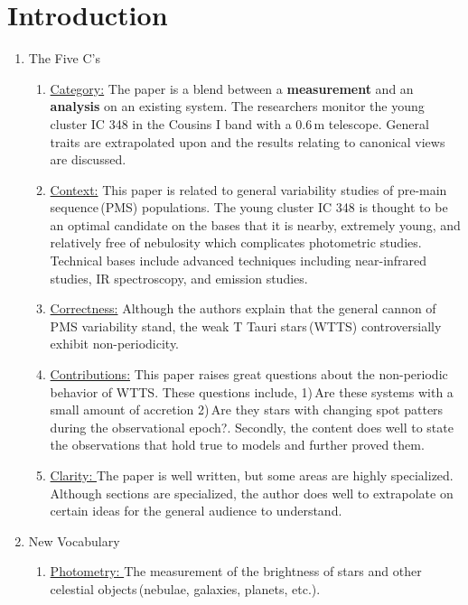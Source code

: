 \documentclass[twocolumn]{aastex6}
\begin{document}

\section{Introduction} \label{sec:intro}
\begin{enumerate}
	\item The Five C's
		\begin{enumerate}
			\item \underline{Category:} The paper is a blend between a \textbf{measurement} and an \textbf{analysis} on an existing system. The researchers monitor the young cluster IC 348 in the Cousins I band with a 0.6\,m telescope. General traits are extrapolated upon and the results relating to canonical views are discussed.
			\item \underline{Context:} This paper is related to general variability studies of pre-main sequence\,(PMS) populations. The young cluster IC 348 is thought to be an optimal candidate on the bases that it is nearby, extremely young, and relatively free of nebulosity which complicates photometric studies. Technical bases include advanced techniques including near-infrared studies, IR spectroscopy, and emission studies.
			\item \underline{Correctness:} Although the authors explain that the general cannon of PMS variability stand, the weak T Tauri stars\,(WTTS) controversially exhibit non-periodicity.
			\item \underline{Contributions:} This paper raises great questions about the non-periodic behavior of WTTS. These questions include, 1)\,Are these systems with a small amount of accretion 2)\,Are they stars with changing spot patters during the observational epoch?. Secondly, the content does well to state the observations that hold true to models and further proved them.
			\item \underline{Clarity: } The paper is well written, but some areas are highly specialized. Although sections are specialized, the author does well to extrapolate on certain ideas for the general audience to understand.
		\end{enumerate}
	\item New Vocabulary
		\begin{enumerate}
		    \item \underline{Photometry: } The measurement of the brightness of stars and other celestial objects\,(nebulae, galaxies, planets, etc.).

\end{enumerate}
\end{enumerate}
\end{document}
